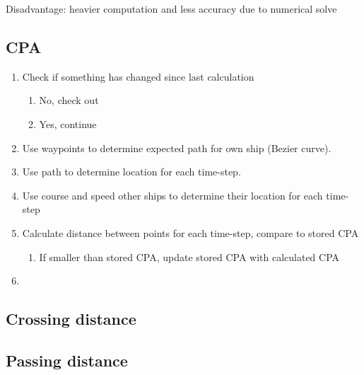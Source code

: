 Disadvantage: heavier computation and less accuracy due to numerical solve

\subsection{CPA}
\begin{enumerate}
	\item Check if something has changed since last calculation
	\begin{enumerate}
		\item No, check out
		\item Yes, continue
	\end{enumerate}
	\item Use waypoints to determine expected path for own ship (Bezier curve).
	\item Use path to determine location for each time-step.
	\item Use course and speed other ships to determine their location for each time-step
	\item Calculate distance between points for each time-step, compare to stored CPA
	\begin{enumerate}
		\item If smaller than stored CPA, update stored CPA with calculated CPA
	\end{enumerate}
	\item 
	
\end{enumerate}


\subsection{Crossing distance}

\subsection{Passing distance}


